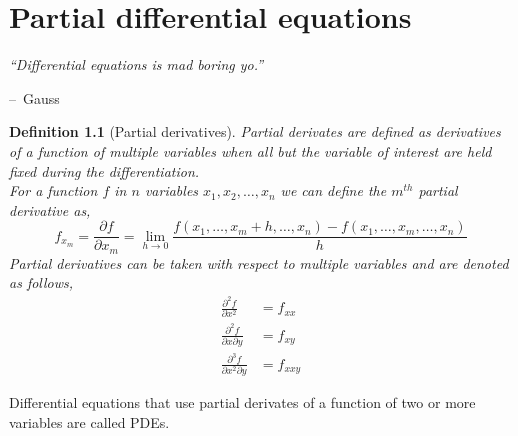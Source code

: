 \documentclass[oneside,11pt,pdftex,final]{book}%
\makeatletter
\numberwithin{equation}{section}
\newenvironment{chapquote}[2][2em]
{\setlength{\@tempdima}{#1}%
	\def\chapquote@author{#2}%
	\parshape 1 \@tempdima \dimexpr\textwidth-2\@tempdima\relax%
	\itshape}
{\par\normalfont\hfill--\ \chapquote@author\hspace*{\@tempdima}\par\bigskip}
\newtheorem{definition}[theorem]{Definition}
\numberwithin{section}{chapter}
\numberwithin{equation}{chapter}
\makeatother
\begin{document}
\chapter{Partial differential equations}

\begin{chapquote}{Gauss}
	``Differential equations is mad boring yo.''
\end{chapquote}


\begin{definition}[Partial derivatives]
	Partial derivates are defined as derivatives of a function of multiple variables when all but the variable of interest are held fixed during the differentiation.\\
	For a function $ f $ in $ n $ variables $ x_1,x_2,\dots, x_n $ we can define the $ m^{th} $ partial derivative as,
	\[ f_{x_m}=\frac{\partial f}{\partial x_m} = \lim_{h \rightarrow 0}\frac{f(x_1,\dots, x_m+h,\dots,x_n)-f(x_1,\dots,x_m, \dots,x_n)}{h}\]
	Partial derivatives can be taken with respect to multiple variables and are denoted as follows,
	\begin{align*}
		\frac{\partial^2 f}{\partial x^2}&=f_{xx}\\
		\frac{\partial^2 f}{\partial x \partial y}&=f_{xy}\\
		\frac{\partial^3 f}{\partial x^2 \partial y}&=f_{xxy}
	\end{align*}
\end{definition}
Differential equations that use partial derivates of a function of two or more variables are called PDEs.
\end{document}
